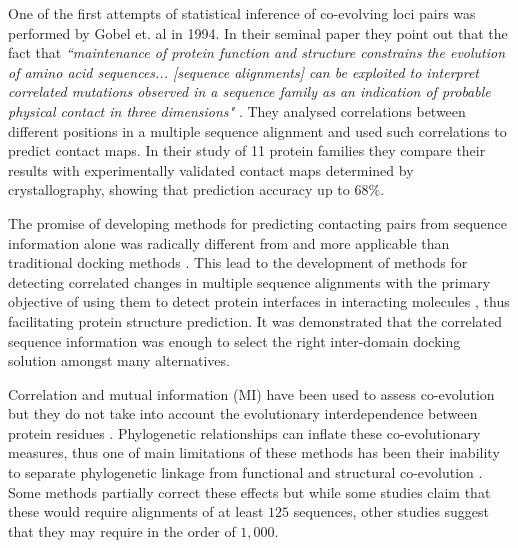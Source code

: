 One of the first attempts of statistical inference of co-evolving loci pairs was performed by Gobel et. al in 1994.
In their seminal paper they point out that the fact that \textit{``maintenance of protein function and structure constrains the evolution of amino acid sequences... [sequence alignments] can be exploited to interpret correlated mutations observed in a sequence family as an indication of probable physical contact in three dimensions"} \cite{gobel1994correlated}. 
They  analysed correlations between different positions in a multiple sequence alignment and used such correlations to predict contact maps.
In their study of 11 protein families they compare their results with experimentally validated contact maps determined by crystallography, showing that prediction accuracy up to $68\%$.

The promise of developing methods for predicting contacting pairs from sequence information alone was radically different from and more applicable than traditional docking methods \cite{pazos1997correlated}.
This lead to the development of methods for detecting correlated changes in multiple sequence alignments with the primary objective of using them to detect protein interfaces in interacting molecules \cite{pazos1997correlated}, thus facilitating protein structure prediction.
It was demonstrated that the correlated sequence information was enough to select the right inter-domain docking solution amongst many alternatives.

Correlation and mutual information (MI) have been used to assess co-evolution but they do not take into account the evolutionary interdependence between protein residues \cite{fares2006novel}.
Phylogenetic relationships can inflate these co-evolutionary measures, thus one of main limitations of these methods has been their inability to separate phylogenetic linkage from functional and structural co-evolution \cite{fares2006novel}.
Some methods partially correct these effects but while some studies \cite{gloor2005mutual} claim that these would require alignments of at least $125$ sequences, other studies \cite{morcos2011direct} suggest that they may require in the order of $1,000$.

